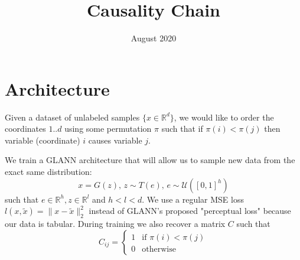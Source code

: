 \documentclass{article}
\title{Causality Chain}
\author{}
\date{August 2020}
\newcommand{\RR}{\mathbb{R}}
\begin{document}
	
	\maketitle
	
	\section{Architecture}
	
	Given a dataset of unlabeled samples $\{x\in \mathbb{R}^d\}$, we would like to order the coordinates $1..d$ using some permutation $\pi$ such that if $\pi(i)<\pi(j)$ then variable (coordinate) $i$ causes variable $j$.
	
	We train a GLANN \cite{GLANN} architecture that will allow us to sample new data from the exact same distribution:
	\begin{equation}
	x = G(z),\, z \sim T(e), \, e \sim \mathcal U ([0,1]^h)
	\end{equation}
	such that $e \in \RR^{h}, z \in \RR^{l}$ and $h < l <d$.
	We use a regular MSE loss $l(x, \tilde x) = \| x - \tilde x \|_2^2$ instead of GLANN's \cite{GLANN} proposed "perceptual loss" because our data is tabular. 
	During training we also recover a matrix $C$ such that
	\begin{equation}
	C_{ij} =  \begin{cases} 1 &\mbox{if } \pi(i)<\pi(j) \\
	0 & \mbox{otherwise} \end{cases}
	\end{equation}
\end{document}
